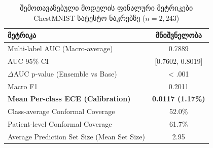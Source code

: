 \documentclass[12pt,a4paper,oneside]{report}
\begin{document}
\begin{table}[H]
\centering
\caption{შემოთავაზებული მოდელის ფინალური მეტრიკები ChestMNIST სატესტო ნაკრებზე ($n=2,243$)}
\label{tab:final_results}
\begin{tabular}{lc}
\toprule
\textbf{მეტრიკა} & \textbf{მნიშვნელობა} \\
\midrule
Multi-label AUC (Macro-average) & 0.7889 \\
AUC 95\% CI & [0.7602, 0.8019] \\
$\Delta$AUC p-value (Ensemble vs Base) & < .001 \\
Macro F1 & 0.2011 \\
\textbf{Mean Per-class ECE (Calibration)} & \textbf{0.0117 (1.17\%)} \\
\midrule
Class-average Conformal Coverage & 52.0\% \\
Patient-level Conformal Coverage & 61.7\% \\
Average Prediction Set Size (Mean Set Size) & 2.95 \\
\bottomrule
\end{tabular}
\end{table}
\end{document}
